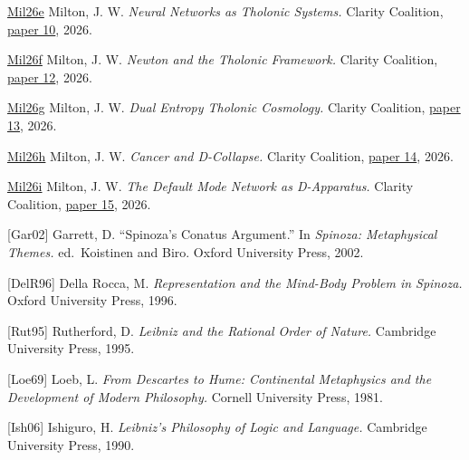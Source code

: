 \documentclass[
  11pt,
  letterpaper,
]{article}
\begin{document}
\href{https://github.com/baardev/truevalue/blob/main/docnav/Research/papers/10_tholonic-neural-architecture/10_tholonic-neural-architecture.pdf}{Mil26e}
Milton, J. W. \emph{Neural Networks as Tholonic Systems.} Clarity
Coalition,
\href{https://github.com/baardev/truevalue/blob/main/docnav/Research/papers/10_tholonic-neural-architecture/10_tholonic-neural-architecture.pdf}{paper
10}, 2026.

\href{https://github.com/baardev/truevalue/blob/main/docnav/Research/papers/12_newton-tholonic-framework/12_newton-tholonic-framework.pdf}{Mil26f}
Milton, J. W. \emph{Newton and the Tholonic Framework.} Clarity
Coalition,
\href{https://github.com/baardev/truevalue/blob/main/docnav/Research/papers/12_newton-tholonic-framework/12_newton-tholonic-framework.pdf}{paper
12}, 2026.

\href{https://github.com/baardev/truevalue/blob/main/docnav/Research/papers/13_dual-entropy-tholonic-cosmology/13_dual-entropy-tholonic-cosmology.pdf}{Mil26g}
Milton, J. W. \emph{Dual Entropy Tholonic Cosmology.} Clarity Coalition,
\href{https://github.com/baardev/truevalue/blob/main/docnav/Research/papers/13_dual-entropy-tholonic-cosmology/13_dual-entropy-tholonic-cosmology.pdf}{paper
13}, 2026.

\href{https://github.com/baardev/truevalue/blob/main/docnav/Research/papers/14_cancer-d-collapse/14_cancer-d-collapse.pdf}{Mil26h}
Milton, J. W. \emph{Cancer and D-Collapse.} Clarity Coalition,
\href{https://github.com/baardev/truevalue/blob/main/docnav/Research/papers/14_cancer-d-collapse/14_cancer-d-collapse.pdf}{paper
14}, 2026.

\href{https://github.com/baardev/truevalue/blob/main/docnav/Research/papers/15_consciousness-dmn-d-apparatus/15_consciousness-dmn-d-apparatus.pdf}{Mil26i}
Milton, J. W. \emph{The Default Mode Network as D-Apparatus.} Clarity
Coalition,
\href{https://github.com/baardev/truevalue/blob/main/docnav/Research/papers/15_consciousness-dmn-d-apparatus/15_consciousness-dmn-d-apparatus.pdf}{paper
15}, 2026.

{[}Gar02{]} Garrett, D. ``Spinoza's Conatus Argument.'' In
\emph{Spinoza: Metaphysical Themes.} ed.~Koistinen and Biro. Oxford
University Press, 2002.

{[}DelR96{]} Della Rocca, M. \emph{Representation and the Mind-Body
Problem in Spinoza.} Oxford University Press, 1996.

{[}Rut95{]} Rutherford, D. \emph{Leibniz and the Rational Order of
Nature.} Cambridge University Press, 1995.

{[}Loe69{]} Loeb, L. \emph{From Descartes to Hume: Continental
Metaphysics and the Development of Modern Philosophy.} Cornell
University Press, 1981.

{[}Ish06{]} Ishiguro, H. \emph{Leibniz's Philosophy of Logic and
Language.} Cambridge University Press, 1990.
\end{document}
